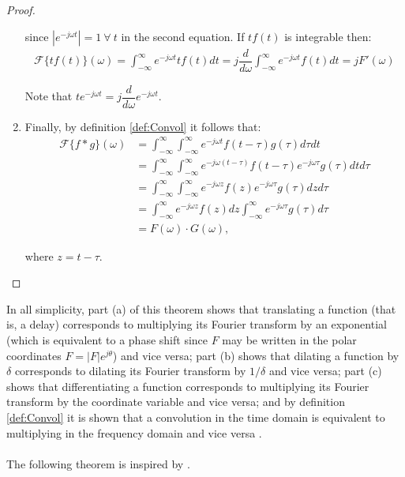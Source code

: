 \begin{proof}
\begin{enumerate}[label=(\alph*)]
since $|e^{-j\omega t}| = 1 \ \forall \ t$ in the second equation. If $tf(t)$ is integrable then:
\begin{align*}
\mathcal{F}\{tf(t)\}(\omega) = \int_{-\infty}^\infty e^{-j \omega t} t f(t) dt = j \dfrac{d}{d\omega} \int_{-\infty}^\infty e^{-j \omega t} f(t) dt = j F'(\omega)
\end{align*}

Note that $t e^{-j \omega t} = j \dfrac{d}{d\omega} e^{-j\omega t}$.

\item Finally, by definition \ref{def:Convol} it follows that:
\begin{align*}
\mathcal{F}\{f*g\}(\omega) &= \int_{-\infty}^\infty \int_{-\infty}^\infty e^{-j \omega t} f(t - \tau) g(\tau) d\tau dt \\
&= \int_{-\infty}^\infty \int_{-\infty}^\infty e^{-j\omega(t-\tau)} f(t-\tau) e^{-j\omega \tau} g(\tau) dt d\tau \\
&= \int_{-\infty}^\infty \int_{-\infty}^\infty e^{-j\omega z} f(z) e^{-j\omega \tau} g(\tau) dz d\tau \\
&= \int_{-\infty}^\infty e^{-j\omega z} f(z) dz \int_{-\infty}^\infty e^{-j\omega \tau} g(\tau) d\tau \\
&= F(\omega) \cdot G(\omega),
\end{align*}

where $z = t - \tau$.
\end{enumerate}
\end{proof}

\noindent
In all simplicity, part (a) of this theorem shows that translating a function (that is, a delay) corresponds to multiplying its Fourier transform by an exponential (which is equivalent to a phase shift since $F$ may be written in the polar coordinates $F = |F|e^{j\theta}$) and vice versa; part (b) shows that dilating a function by $\delta$ corresponds to dilating its Fourier transform by $1/\delta$ and vice versa; part (c) shows that differentiating a function corresponds to multiplying its Fourier transform by the coordinate variable and vice versa; and by definition \ref{def:Convol} it is shown that a convolution in the time domain is equivalent to multiplying in the frequency domain and vice versa \cite{page 215, FAA}.
\\ \\
The following theorem is inspired by \cite{page 77, FAA}. 

